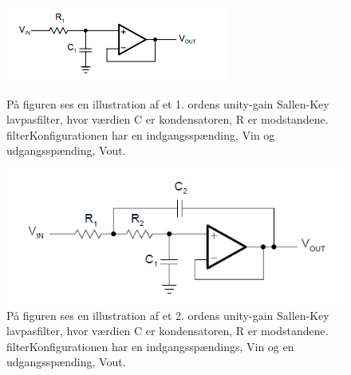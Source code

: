 \begin{figure}[H]
	\centering
	\begin{minipage}[b]{0.45\textwidth}
		\includegraphics[width=\textwidth]{figures/cProblemloesning/Lavpasfilter1_teoretisk.PNG}
		\caption{På figuren ses en illustration af et 1. ordens unity-gain Sallen-Key lavpasfilter, hvor værdien C er kondensatoren, R er modstandene. filterKonfigurationen har en indgangsspænding, Vin og udgangsspænding, Vout. \citep{Carter2013}}
		\label{fig:SallenKey1}
	\end{minipage}
	\hfill
	\begin{minipage}[b]{0.45\textwidth}
		\includegraphics[width=\textwidth]{figures/cProblemloesning/Sallenlavpas.PNG}
		\caption{På figuren ses en illustration af et 2. ordens unity-gain Sallen-Key lavpasfilter, hvor værdien C er kondensatoren, R er modstandene. filterKonfigurationen har en indgangsspændings, Vin og en udgangsspænding, Vout. \citep{Carter2013}}
		\label{fig:SallenKey2}
	\end{minipage}
\end{figure}

